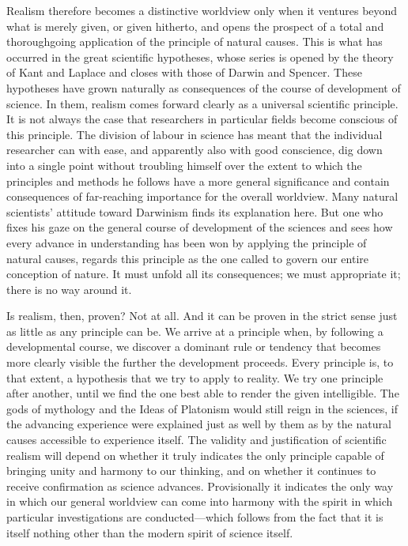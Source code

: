 \documentclass[12pt,a4paper]{article}
\newcommand{\opage}[1]{\marginnote{\footnotesize\textit{[#1]}}}
\begin{document}
Realism therefore becomes a distinctive worldview only when it ventures
beyond what is merely given, or given hitherto, and opens the prospect of
a total and thoroughgoing application of the principle of natural causes.
This is what has occurred in the great scientific hypotheses, whose series
is opened by the theory of Kant and Laplace and closes with those of
Darwin and Spencer. These hypotheses have grown naturally as consequences
of the course of development of science. In them, realism comes forward
clearly as a universal scientific principle. It is not always the case
that researchers in particular fields become conscious of this principle.
The division of labour in science has meant that the individual researcher
can with ease, and apparently also with good conscience, dig down into a
single point without troubling himself over the extent to which the
principles and methods he follows have a more general significance and
contain consequences of far-reaching importance for the overall worldview.
Many natural scientists' attitude toward Darwinism finds its explanation
here. But one who fixes his gaze on the general course of development of
the sciences and sees how every advance in understanding has been won by
applying the principle of natural causes, regards this principle as the
one called to govern our entire conception of nature. It must unfold all
its consequences; we must appropriate it; there is no way around it.

Is realism, then, proven? Not at all. And it can be proven in the strict
sense just as little as any principle can be. We arrive at a principle
when, by following a developmental course, we discover a dominant rule or
tendency that becomes more clearly visible the further the development
proceeds. Every principle is, to that extent, a hypothesis that we try to
apply to reality. We try one principle after another, until we find the
one best able to render the given intelligible. The gods of mythology and
the Ideas of Platonism would still reign in the sciences, if the advancing
experience were explained just as well by them as by the natural \opage{7}causes
accessible to experience itself. The validity and justification of
scientific realism will depend on whether it truly indicates the only
principle capable of bringing unity and harmony to our thinking, and on
whether it continues to receive confirmation as science advances.
Provisionally it indicates the only way in which our general worldview can
come into harmony with the spirit in which particular investigations are
conducted---which follows from the fact that it is itself nothing other
than the modern spirit of science itself.
\end{document}
